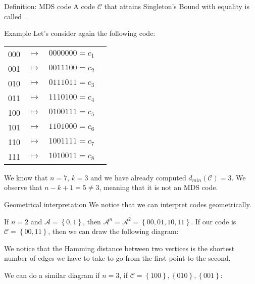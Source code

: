 \documentclass[a4paper]{article}
\begin{document}
\begin{parag}{Definition: MDS code}
    A code $\mathcal{C}$ that attains Singleton's Bound with equality is called .
\end{parag}

\begin{parag}{Example}
    Let's consider again the following code:
    \begin{center}
    \begin{tabular}{cccc}
        000 & $\mapsto$ & $0000000 = c_1$ \\
        001 & $\mapsto$ & $0011100 = c_2$ \\
        010 & $\mapsto$ & $0111011 = c_3$ \\
        011 & $\mapsto$ & $1110100 = c_4$ \\
        100 & $\mapsto$ & $0100111 = c_5$ \\
        101 & $\mapsto$ & $1101000 = c_6$ \\
        110 & $\mapsto$ & $1001111 = c_7$ \\
        111 & $\mapsto$ & $1010011 = c_8$ 
    \end{tabular}
    \end{center}

    We know that $n = 7$, $k = 3$ and we have already computed $d_{min}\left(\mathcal{C}\right) = 3$. We observe that $n - k + 1 = 5 \neq 3$, meaning that it is not an MDS code.
\end{parag}

\begin{parag}{Geometrical interpretation}
    We notice that we can interpret codes geometrically.

    If $n = 2$ and $\mathcal{A} = \left\{0, 1\right\}$, then $\mathcal{A}^n = \mathcal{A}^2 = \left\{00, 01, 10, 11\right\}$. If our code is $\mathcal{C} =\left\{00, 11\right\}$, then we can draw the following diagram:

    We notice that the Hamming distance between two vertices is the shortest number of edges we have to take to go from the first point to the second.

    We can do a similar diagram if $n = 3$, if $\mathcal{C} = \left\{100\right\}, \left\{010\right\}, \left\{001\right\}$:
\end{parag}
\end{document}
